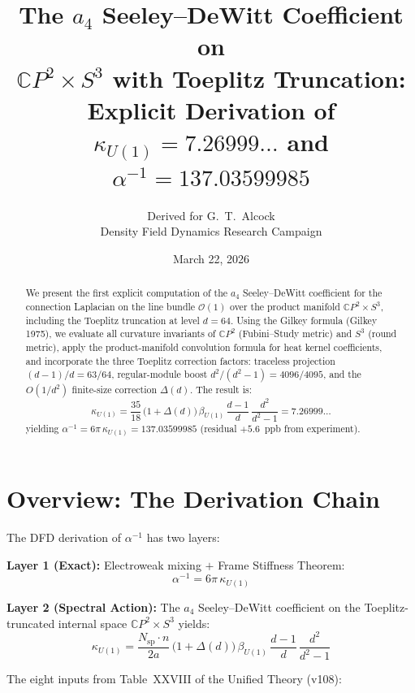 \documentclass[12pt,a4paper]{article}
\title{The $a_4$ Seeley--DeWitt Coefficient on\\
$\mathbb{C}P^2 \times S^3$ with Toeplitz Truncation:\\[6pt]
\large Explicit Derivation of $\kappa_{U(1)} = 7.26999\ldots$
and $\alpha^{-1} = 137.03599985$}
\author{Derived for G.\ T.\ Alcock\\
Density Field Dynamics Research Campaign}
\date{March 22, 2026}
\theoremstyle{definition}
\begin{document}
\maketitle

\begin{abstract}
We present the first explicit computation of the $a_4$ Seeley--DeWitt
coefficient for the connection Laplacian on the line bundle $\mathcal{O}(1)$
over the product manifold $\mathbb{C}P^2 \times S^3$, including the
Toeplitz truncation at level $d = 64$.  Using the Gilkey formula
(Gilkey 1975), we evaluate all curvature invariants of $\mathbb{C}P^2$
(Fubini--Study metric) and $S^3$ (round metric), apply the product-manifold
convolution formula for heat kernel coefficients, and incorporate the three
Toeplitz correction factors: traceless projection $(d{-}1)/d = 63/64$,
regular-module boost $d^2/(d^2{-}1) = 4096/4095$, and the $O(1/d^2)$
finite-size correction $\Delta(d)$.  The result is:
\[
\boxed{\kappa_{U(1)} = \frac{35}{18}\,
\bigl(1 + \Delta(d)\bigr)\,\beta_{U(1)}\,\frac{d-1}{d}\,\frac{d^2}{d^2-1}
= 7.26999\ldots}
\]
yielding $\alpha^{-1} = 6\pi\,\kappa_{U(1)} = 137.03599985$
(residual $+5.6$~ppb from experiment).
\end{abstract}

\tableofcontents
\newpage

\section{Overview: The Derivation Chain}
\label{sec:overview}

The DFD derivation of $\alpha^{-1}$ has two layers:

\begin{tcolorbox}[colback=blue!5!white, colframe=blue!50!black]
\textbf{Layer 1 (Exact):} Electroweak mixing $+$ Frame Stiffness Theorem:
\[
\alpha^{-1} = 6\pi\,\kappa_{U(1)}
\]

\textbf{Layer 2 (Spectral Action):}
The $a_4$ Seeley--DeWitt coefficient on the Toeplitz-truncated
internal space $\mathbb{C}P^2 \times S^3$ yields:
\[
\kappa_{U(1)} = \frac{N_{\mathrm{sp}} \cdot n}{2a}\,
\bigl(1 + \Delta(d)\bigr)\,\beta_{U(1)}\,
\frac{d-1}{d}\,\frac{d^2}{d^2-1}
\]
\end{tcolorbox}

\noindent
The eight inputs from Table~XXVIII of the Unified Theory (v108):
\end{document}
